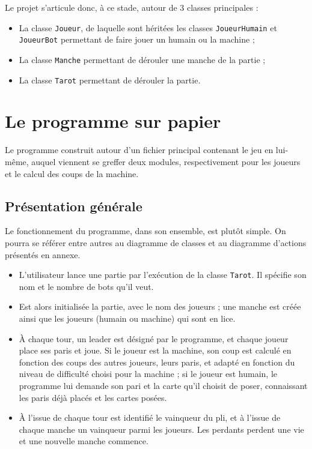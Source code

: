       Le projet s'articule donc, à ce stade, autour de 3 classes principales :
      \begin{itemize}
         \item La classe \texttt{Joueur}, de laquelle sont héritées les classes \texttt{JoueurHumain} et \texttt{JoueurBot} permettant de faire jouer un humain ou la machine ;
         \item La classe \texttt{Manche} permettant de dérouler une manche de la partie ;
         \item La classe \texttt{Tarot} permettant de dérouler la partie.
      \end{itemize}


\section{Le programme sur papier}\label{sec:le-programme-sur-papier}
   Le programme construit autour d'un fichier principal contenant le jeu en lui-même, auquel viennent se greffer deux modules, respectivement pour les joueurs et le calcul des coups de la machine.

   \subsection{Présentation générale}\label{subsec:présentation-générale}
      Le fonctionnement du programme, dans son ensemble, est plutôt simple.
      On pourra se référer entre autres au diagramme de classes et au diagramme d'actions présentés en annexe.
      \begin{itemize}
         \item L'utilisateur lance une partie par l'exécution de la classe \texttt{Tarot}.
         Il spécifie son nom et le nombre de bots qu'il veut.
         \item Est alors initialisée la partie, avec le nom des joueurs ;
         une manche est créée ainsi que les joueurs (humain ou machine) qui sont en lice.
         \item À chaque tour, un leader est désigné par le programme, et chaque joueur place ses paris et joue.
         Si le joueur est la machine, son coup est calculé en fonction des coups des autres joueurs, leurs paris, et adapté en fonction du niveau de difficulté choisi pour la machine ;
         si le joueur est humain, le programme lui demande son pari et la carte qu'il choisit de poser, connaissant les paris déjà placés et les cartes posées.
         \item À l'issue de chaque tour est identifié le vainqueur du pli, et à l'issue de chaque manche un vainqueur parmi les joueurs.
         Les perdants perdent une vie et une nouvelle manche commence.
      \end{itemize}


